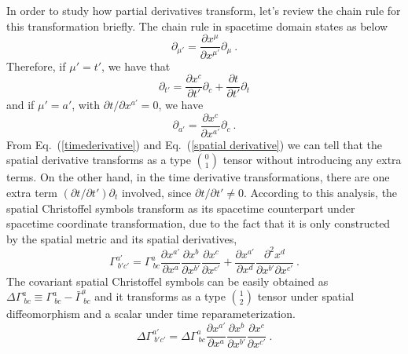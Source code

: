 In order to study how partial derivatives transform, let's review the chain rule for this transformation briefly. The chain rule in spacetime domain states as below
\begin{equation}
\partial_{\mu'} = \frac{\partial x^{\mu}}{\partial x^{\mu'}}\partial_{\mu} \ .
\end{equation}
Therefore, if $\mu' = t'$, we have that
\begin{equation}\label{timederivative}
\partial_{t'} = \frac{\partial x^{c}}{\partial t'}\partial_{c} + \frac{\partial t}{\partial t'}\partial_{t}
\end{equation}
and if $\mu' = a'$, with $\partial t/\partial x^{a'} = 0$, we have
\begin{equation}\label{spatial derivative}
\partial_{a'} = \frac{\partial x^{c}}{\partial x^{a'}}\partial_{c} \ .
\end{equation}
From Eq.~(\ref{timederivative}) and Eq.~(\ref{spatial derivative}) we can tell that the spatial derivative transforms as a type $0 \choose 1$ tensor without introducing any extra terms. On the other hand, in the time derivative transformations, there are one extra term $\left(\partial t/\partial t'\right)\partial_{t}$ involved, since $\partial t/\partial t' \ne 0$. According to this analysis, the spatial Christoffel symbols transform as its spacetime counterpart under spacetime coordinate transformation, due to the fact that it is only constructed by the spatial metric and its spatial derivatives, 
\begin{equation}
\Gamma^{a'}_{~b'c'} = \Gamma^{a}_{~bc}\frac{\partial x^{a'}}{\partial x^{a}}\frac{\partial x^{b}}{\partial x^{b'}}\frac{\partial x^{c}}{\partial x^{c'}} + \frac{\partial x^{a'}}{\partial x^{d}}\frac{\partial^{2} x^{d}}{\partial x^{b'}\partial x^{c'}} \ .
\end{equation}
The covariant spatial Christoffel symbols can be easily obtained as $\Delta \Gamma^{a}_{~bc} \equiv \Gamma^{a}_{~bc} - {\bar \Gamma}^{a}_{~bc}$ and it transforms as a type $1 \choose 2$ tensor under spatial diffeomorphism and a scalar under time reparameterization. 
\begin{equation}
	\Delta \Gamma^{a'}_{~b'c'} = \Delta \Gamma^{a}_{~bc}\frac{\partial x^{a'}}{\partial x^{a}}\frac{\partial x^{b}}{\partial x^{b'}}\frac{\partial x^{c}}{\partial x^{c'}} \ .	
\end{equation}

